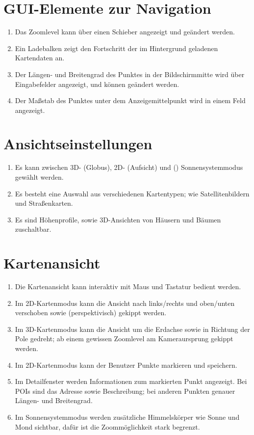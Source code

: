 \documentclass[10pt]{scrreprt}
\begin{document}
\section{GUI-Elemente zur Navigation}
\begin{enumerate}[leftmargin=2cm,resume]
\item Das Zoomlevel kann über einen Schieber angezeigt und geändert werden.
\item Ein Ladebalken zeigt den Fortschritt der im Hintergrund geladenen Kartendaten an.
\item Der Längen- und Breitengrad des Punktes in der Bildschirmmitte wird über Eingabefelder angezeigt, und können geändert werden.
\item Der Maßstab des Punktes unter dem Anzeigemittelpunkt wird in einem Feld angezeigt.
\end{enumerate}

\section{Ansichtseinstellungen}
\begin{enumerate}[leftmargin=2cm,resume]
\item Es kann zwischen 3D- (Globus), 2D- (Aufsicht) und (\W) Sonnensystemmodus gewählt werden.
\item Es besteht eine Auswahl aus verschiedenen Kartentypen; wie Satellitenbildern und Straßenkarten.
\item \W Es sind Höhenprofile, sowie 3D-Ansichten von Häusern und 
Bäumen zuschaltbar.
\end{enumerate}

\section{Kartenansicht}
\begin{enumerate}[leftmargin=2cm,resume]
\item Die Kartenansicht kann interaktiv mit Maus und Tastatur bedient werden.
\item Im 2D-Kartenmodus kann die Ansicht nach links/rechts und oben/unten verschoben sowie (perspektivisch) gekippt werden. 
\item Im 3D-Kartenmodus kann die Ansicht um die Erdachse sowie in Richtung der Pole gedreht; ab einem gewissen Zoomlevel am Kameraursprung gekippt werden.
\item Im 2D-Kartenmodus kann der Benutzer Punkte markieren und speichern.
\item \W Im Detailfenster werden Informationen zum markierten Punkt angezeigt. Bei POIs sind das Adresse sowie Beschreibung; bei anderen Punkten genauer Längen- und Breitengrad.
\item \W Im Sonnensystemmodus werden zusätzliche Himmelskörper wie Sonne und Mond sichtbar, dafür ist die Zoommöglichkeit stark begrenzt.
\end{enumerate}
\end{document}
